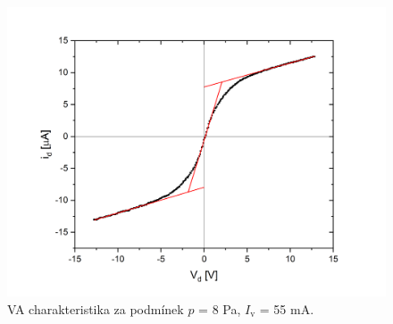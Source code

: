 \documentclass[a4paper,12pt]{article}
\begin{document}
\newpage
\begin{figure}[h!]
	\centering
	\includegraphics[width=130mm]{dvojna1.png}
	\caption{VA charakteristika za podmínek $p$ = 8 \si{\pascal}, $I_\text{{v}}$ = 55 \si{\milli\ampere}.}
	\label{dvojna1}
\end{figure}
\end{document}
